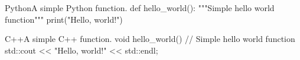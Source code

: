 \documentclass[../main.tex]{subfiles}
\begin{document}
\begin{codeblock}
\begin{code}{Python}{A simple Python function.}
def hello_world():
    """Simple hello world function"""
    print("Hello, world!")
\end{code}
\caption{A simple Python function.}
\end{codeblock}

\begin{codeblock}
\begin{code}{C++}{A simple C++ function.}
void hello_world() {
    // Simple hello world function
    std::cout << "Hello, world!" << std::endl;
}
\end{code}
\caption{A simple C++ function.}
\end{codeblock}




\end{document}
